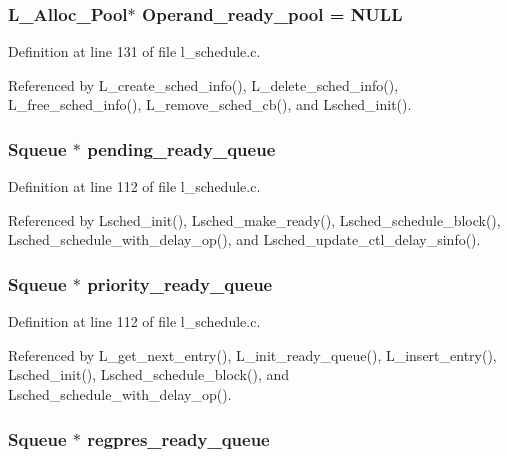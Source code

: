 \subsubsection{\setlength{\rightskip}{0pt plus 5cm}\bf{L\_\-Alloc\_\-Pool}$\ast$ \bf{Operand\_\-ready\_\-pool} = \bf{NULL}}\label{l__schedule_8c_5aeea507b43d25bfcbdd09f85aa420ca}




Definition at line 131 of file l\_\-schedule.c.

Referenced by L\_\-create\_\-sched\_\-info(), L\_\-delete\_\-sched\_\-info(), L\_\-free\_\-sched\_\-info(), L\_\-remove\_\-sched\_\-cb(), and Lsched\_\-init().
\subsubsection{\setlength{\rightskip}{0pt plus 5cm}\bf{Squeue} $\ast$ \bf{pending\_\-ready\_\-queue}}\label{l__schedule_8c_065691cd75db4683c71bba868f90264d}




Definition at line 112 of file l\_\-schedule.c.

Referenced by Lsched\_\-init(), Lsched\_\-make\_\-ready(), Lsched\_\-schedule\_\-block(), Lsched\_\-schedule\_\-with\_\-delay\_\-op(), and Lsched\_\-update\_\-ctl\_\-delay\_\-sinfo().
\subsubsection{\setlength{\rightskip}{0pt plus 5cm}\bf{Squeue} $\ast$ \bf{priority\_\-ready\_\-queue}}\label{l__schedule_8c_7ad0faa72489db11d3885ff9a0f42366}




Definition at line 112 of file l\_\-schedule.c.

Referenced by L\_\-get\_\-next\_\-entry(), L\_\-init\_\-ready\_\-queue(), L\_\-insert\_\-entry(), Lsched\_\-init(), Lsched\_\-schedule\_\-block(), and Lsched\_\-schedule\_\-with\_\-delay\_\-op().
\subsubsection{\setlength{\rightskip}{0pt plus 5cm}\bf{Squeue} $\ast$ \bf{regpres\_\-ready\_\-queue}}\label{l__schedule_8c_99d40e945682d462016f6899c74be8d9}




